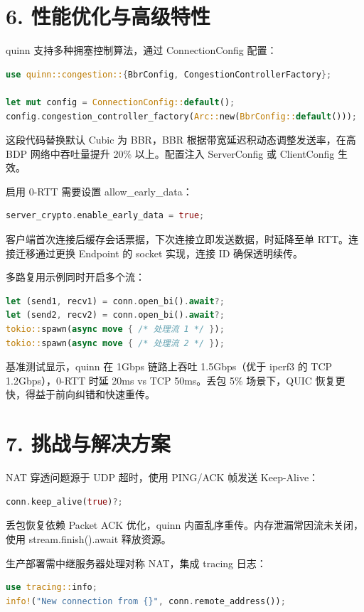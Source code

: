 \chapter{6. 性能优化与高级特性}
quinn 支持多种拥塞控制算法，通过 ConnectionConfig 配置：\par
\begin{lstlisting}[language=rust]
use quinn::congestion::{BbrConfig, CongestionControllerFactory};

let mut config = ConnectionConfig::default();
config.congestion_controller_factory(Arc::new(BbrConfig::default()));
\end{lstlisting}
这段代码替换默认 Cubic 为 BBR，BBR 根据带宽延迟积动态调整发送率，在高 BDP 网络中吞吐量提升 20\%{} 以上。配置注入 ServerConfig 或 ClientConfig 生效。\par
启用 0-RTT 需要设置 allow\_{}early\_{}data：\par
\begin{lstlisting}[language=rust]
server_crypto.enable_early_data = true;
\end{lstlisting}
客户端首次连接后缓存会话票据，下次连接立即发送数据，时延降至单 RTT。连接迁移通过更换 Endpoint 的 socket 实现，连接 ID 确保透明续传。\par
多路复用示例同时开启多个流：\par
\begin{lstlisting}[language=rust]
let (send1, recv1) = conn.open_bi().await?;
let (send2, recv2) = conn.open_bi().await?;
tokio::spawn(async move { /* 处理流 1 */ });
tokio::spawn(async move { /* 处理流 2 */ });
\end{lstlisting}
基准测试显示，quinn 在 1Gbps 链路上吞吐 1.5Gbps（优于 iperf3 的 TCP 1.2Gbps），0-RTT 时延 20ms vs TCP 50ms。丢包 5\%{} 场景下，QUIC 恢复更快，得益于前向纠错和快速重传。\par
\chapter{7. 挑战与解决方案}
NAT 穿透问题源于 UDP 超时，使用 PING/ACK 帧发送 Keep-Alive：\par
\begin{lstlisting}[language=rust]
conn.keep_alive(true)?;
\end{lstlisting}
丢包恢复依赖 Packet ACK 优化，quinn 内置乱序重传。内存泄漏常因流未关闭，使用 stream.finish().await 释放资源。\par
生产部署需中继服务器处理对称 NAT，集成 tracing 日志：\par
\begin{lstlisting}[language=rust]
use tracing::info;
info!("New connection from {}", conn.remote_address());
\end{lstlisting}
